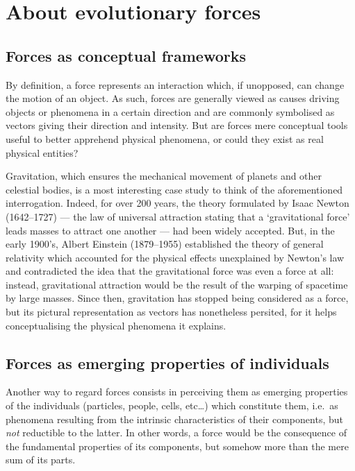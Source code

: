 \section{About evolutionary forces}

\subsection{Forces as conceptual frameworks} 

By definition, a force represents an interaction which, if unopposed, can change the motion of an object.
As such, forces are generally viewed as causes driving objects or phenomena in a certain direction and are commonly symbolised as vectors giving their direction and intensity.
But are forces mere conceptual tools useful to better apprehend physical phenomena, or could they exist as real physical entities?

Gravitation, which ensures the mechanical movement of planets and other celestial bodies, is a most interesting case study to think of the aforementioned interrogation.
Indeed, for over 200 years, the theory formulated by Isaac Newton (1642--1727) — the law of universal attraction stating that a ‘gravitational force’ leads masses to attract one another — had been widely accepted.
But, in the early 1900's, Albert Einstein (1879--1955) established the theory of general relativity which accounted for the physical effects unexplained by Newton's law and contradicted the idea that the gravitational force was even a force at all: instead, gravitational attraction would be the result of the warping of spacetime by large masses.
Since then, gravitation has stopped being considered as a force, but its pictural representation as vectors has nonetheless persited, for it helps conceptualising the physical phenomena it explains.




\subsection{Forces as emerging properties of individuals}

Another way to regard forces consists in perceiving them as emerging properties of the individuals (particles, people, cells, etc…) which constitute them, i.e.\ as phenomena resulting from the intrinsic characteristics of their components, but \textit{not} reductible to the latter. 
In other words, a force would be the consequence of the fundamental properties of its components, but somehow more than the mere sum of its parts.

